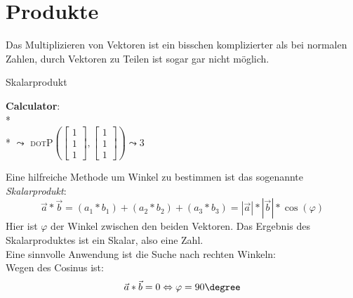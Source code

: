 \section{Produkte}
Das Multiplizieren von Vektoren ist ein bisschen komplizierter als bei normalen Zahlen, durch Vektoren zu Teilen ist sogar gar nicht möglich.

\begin{bla}{Skalarprodukt}
   \begin{marginfigure}[5em]
    \begin{tcolorbox}[colback=white!95!black,colframe=white!75!black,title=CAS:,arc=0mm]
      \begin{scriptsize}
        \textbf{Calculator}: \\*
         \\*
        \( \leadsto \) \textsc{dotP}\( \left( \left[ \begin{smallmatrix}
          1 \\ 1 \\ 1
        \end{smallmatrix} \right], \left[ \begin{smallmatrix}
          1 \\ 1 \\ 1
        \end{smallmatrix} \right] \right) \leadsto 3 \)
      \end{scriptsize}
    \end{tcolorbox}
  \end{marginfigure}
  Eine hilfreiche Methode um Winkel zu bestimmen ist das sogenannte \emph{Skalarprodukt}:
  \begin{equation*}
    \vec{a} * \vec{b} = (a_1*b_1) + (a_2*b_2) + (a_3*b_3) = |\vec{a}|*|\vec{b}|*\cos(\varphi)
  \end{equation*}
  Hier ist $\varphi$ der Winkel zwischen den beiden Vektoren.
  Das Ergebnis des Skalarproduktes ist ein Skalar, also eine Zahl.
  \\
  Eine sinnvolle Anwendung ist die Suche nach rechten Winkeln:\\
  Wegen des Cosinus ist:
  \begin{equation*}
    \vec{a} * \vec{b} = 0
    \Leftrightarrow
    \varphi = 90\degree
  \end{equation*}
\end{bla}

